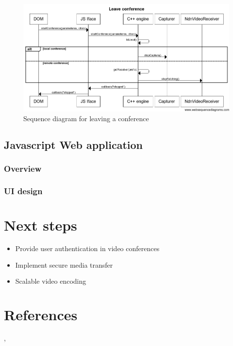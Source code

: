 \documentclass[12pt]{article}
\begin{document}
\begin{figure}
\centering
\includegraphics[width=\textwidth]{../res/graphics/leave-seq}
\caption{Sequence diagram for leaving a conference}
\label{fig:leave}
\end{figure}


\subsection{Javascript Web application}
\subsubsection{Overview}
\subsubsection{UI design}

\section{Next steps}
\begin{itemize}
\item Provide user authentication in video conferences
\item Implement secure media transfer
\item Scalable video encoding
\end{itemize}

\section{References} \cite{videoTR}, \cite{ChronosTR}


\end{document}

